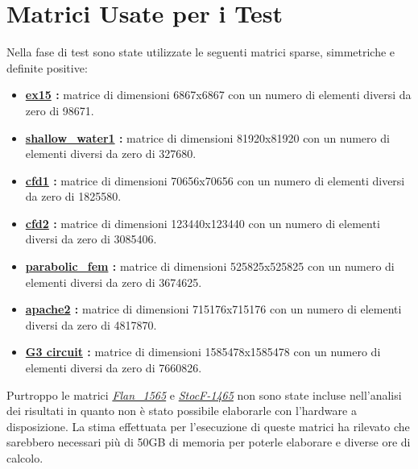 \documentclass[a4paper,12pt,titlepage,oneside]{book}
\begin{document}
    \section{Matrici Usate per i Test}
    \noindent Nella fase di test sono state utilizzate le seguenti matrici sparse, simmetriche e definite positive:
    \begin{itemize}
        \item{\textbf{\href{https://sparse.tamu.edu/FIDAP/ex15}{ex15} :}} matrice di dimensioni 6867x6867 con un numero di elementi diversi da zero di 98671.

        \item{\textbf{\href{https://sparse.tamu.edu/MaxPlanck/shallow_water1}{shallow\_water1} :}} matrice di dimensioni 81920x81920 con un numero di elementi diversi da zero di 327680.
        
        \item{\textbf{\href{https://sparse.tamu.edu/Rothberg/cfd1}{cfd1} :}} matrice di dimensioni 70656x70656 con un numero di elementi diversi da zero di 1825580.
        
        \item{\textbf{\href{https://sparse.tamu.edu/Rothberg/cfd2}{cfd2} :}} matrice di dimensioni 123440x123440 con un numero di elementi diversi da zero di 3085406.
        
        \item{\textbf{\href{https://sparse.tamu.edu/Wissgott/parabolic_fem}{parabolic\_fem} :}} matrice di dimensioni 525825x525825 con un numero di elementi diversi da zero di 3674625.
        
        \item{\textbf{\href{https://sparse.tamu.edu/GHS_psdef/apache2}{apache2} :}} matrice di dimensioni 715176x715176 con un numero di elementi diversi da zero di 4817870.
        
        \item{\textbf{\href{https://sparse.tamu.edu/AMD/G3_circuit}{G3 circuit} :}} matrice di dimensioni 1585478x1585478 con un numero di elementi diversi da zero di 7660826.
    \end{itemize}
    \noindent Purtroppo le matrici \textit{\href{https://sparse.tamu.edu/Janna/Flan_1565}{Flan\_1565}} e \textit{\href{https://sparse.tamu.edu/Janna/StocF-1465}{StocF-1465}} non sono state incluse nell'analisi dei risultati in quanto non è stato possibile elaborarle con l'hardware a disposizione. La stima effettuata per l'esecuzione di queste matrici ha rilevato che sarebbero necessari più di 50GB di memoria per poterle elaborare e diverse ore di calcolo.
    
\end{document}
